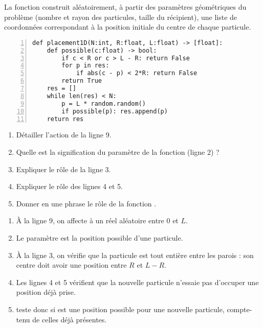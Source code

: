 La fonction  construit aléatoirement, à partir des
paramètres géométriques du problème (nombre et rayon des particules,
taille du récipient), une liste de coordonnées correspondant à la
position initiale du centre de chaque particule.
\begin{lstlisting}[numbers=left]
def placement1D(N:int, R:float, L:float) -> [float]:
    def possible(c:float) -> bool:
        if c < R or c > L - R: return False
        for p in res:
            if abs(c - p) < 2*R: return False
        return True    
    res = []
    while len(res) < N:
        p = L * random.random()
        if possible(p): res.append(p)
    return res
\end{lstlisting}
\begin{Exercise}\it 
\begin{enumerate}
    \item Détailler l'action de la ligne 9.
    \item Quelle est la signification du paramètre  de la
fonction  (ligne 2) ?
    \item Expliquer le rôle de la ligne 3.
    \item Expliquer le rôle des lignes 4 et 5.
    \item Donner en une phrase le rôle de la fonction .
 \end{enumerate}
\end{Exercise}
\begin{Answer}
\begin{enumerate}
    \item À la ligne $9$, on affecte à  un réel aléatoire entre 0 et $L$.
    \item Le paramètre  est la position possible d'une particule.
    \item À la ligne 3, on vérifie que la particule est tout entière entre les parois : son centre doit avoir une position entre $R$ et $L-R$.
    \item Les lignes 4 et 5  vérifient que la nouvelle particule n'essaie pas d'occuper une position déjà prise.
    \item {} teste donc si  est une position possible pour une nouvelle particule, compte-tenu de celles déjà présentes.
 \end{enumerate}
\end{Answer}
